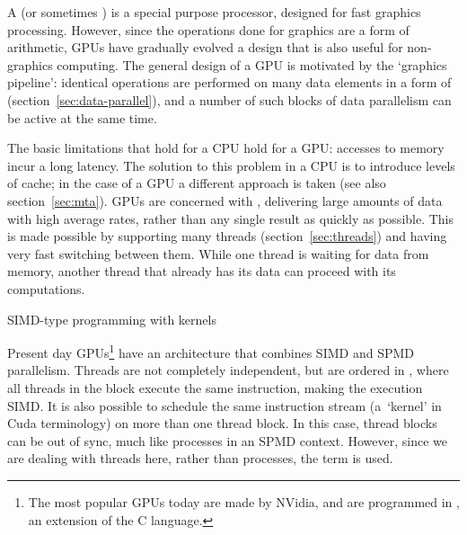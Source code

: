 
A  (or sometimes ) is a special purpose processor,
designed for fast graphics processing. However, since the operations
done for graphics are a form of arithmetic, \acp{GPU} have gradually
evolved a design that is also useful for non-graphics computing.
The general design of a \ac{GPU} is motivated by the `graphics
pipeline': identical
operations are performed on many data elements
in a form of 
(section~\ref{sec:data-parallel}),
and a number of such
blocks of data parallelism can be active at the same time.

The basic limitations that hold for a CPU hold for a \ac{GPU}:
accesses to memory incur a long latency. The solution to this problem
in a CPU is to introduce levels of cache; in the case of a \ac{GPU} a
different approach is taken (see also
section~\ref{sec:mta}). \acp{GPU} are concerned with
, delivering large amounts of data
with high average rates, rather than any single result as quickly as
possible. This is made possible by supporting many threads
(section~\ref{sec:threads}) and having very fast switching between
them. While one thread is waiting for data from memory, another thread
that already has its data can proceed with its computations.

 {SIMD-type programming with kernels}
\label{sec:gpu-kernel}

Present day \acp{GPU}\footnote{The most popular GPUs today are made by
  NVidia, and are programmed in , an extension of the
  C language.}%
have an architecture that combines \ac{SIMD}
and \ac{SPMD} parallelism. Threads are not completely independent, but
are ordered in , where all threads in the
block execute the same instruction, making the execution \ac{SIMD}. It
is also possible to schedule the same instruction stream
(a~`kernel' in Cuda terminology) on more than one
thread block. In this case, thread blocks can be out of sync, much
like processes in an \ac{SPMD} context. However, since we are dealing
with threads here, rather than processes, the term  is used.

